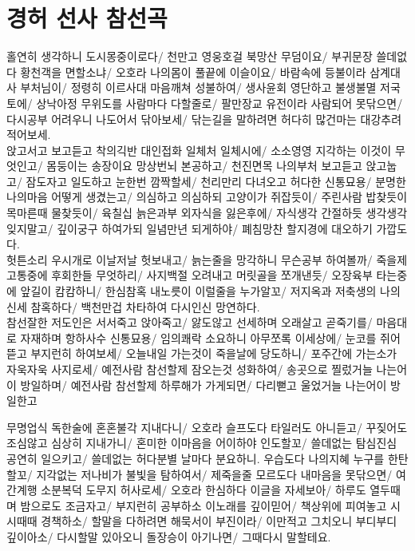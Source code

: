\documentclass[12pt, a4paper, oneside]{book}
\let\stdsection\section
\renewcommand\section{\newpage\stdsection}
\begin{document}
%										
	\section{ 경허 선사 참선곡 }


홀연히 생각하니 도시몽중이로다/ 천만고 영웅호걸 북망산 무덤이요/ 부귀문장 쓸데없다 황천객을 면할소냐/ 오호라 나의몸이 풀끝에 이슬이요/ 바람속에 등불이라 삼계대사 부처님이/ 정령히 이르사대 마음깨쳐 성불하여/ 생사윤회 영단하고 불생불멸 저국토에/ 상낙아정 무위도를 사람마다 다할줄로/ 팔만장교 유전이라 사람되어 못닦으면/ 다시공부 어려우니 나도어서 닦아보세/ 닦는길을 말하려면 허다히 많건마는 대강추려 적어보세.\\

앉고서고 보고듣고 착의긱반 대인접화 일체처 일체시에/ 소소영영 지각하는 이것이 무엇인고/ 몸둥이는 송장이요 망상번뇌 본공하고/ 천진면목 나의부처 보고듣고 앉고눕고/ 잠도자고 일도하고 눈한번 깜짝할세/ 천리만리 다녀오고 허다한 신통묘용/ 분명한 나의마음 어떻게 생겼는고/ 의심하고 의심하되 고양이가 쥐잡듯이/ 주린사람 밥찾듯이 목마른때 물찾듯이/ 육칠십 늙은과부 외자식을 잃은후에/ 자식생각 간절하듯 생각생각 잊지말고/ 깊이궁구 하여가되 일념만년 되게하야/ 폐침망찬 할지경에 대오하기 가깝도다.\\

헛튼소리 우시개로 이날저날 헛보내고/ 늙는줄을 망각하니 무슨공부 하여볼까/ 죽을제 고통중에 후회한들 무엇하리/ 사지백절 오려내고 머릿골을 쪼개낸듯/ 오장육부 타는중에 앞길이 캄캄하니/ 한심참혹 내노릇이 이럴줄을 누가알꼬/ 저지옥과 저축생의 나의신세 참혹하다/ 백천만겁 차타하여 다시인신 망연하다.\\

참선잘한 저도인은 서서죽고 앉아죽고/ 앓도않고 선세하며 오래살고 곧죽기를/ 마음대로 자재하며 항하사수 신통묘용/ 임의쾌락 소요하니 아무쪼록 이세상에/ 눈코를 쥐어뜯고 부지런히 하여보세/ 오늘내일 가는것이 죽을날에 당도하니/ 포주간에 가는소가 자욱자욱 사지로세/ 예전사람 참선할제 잠오는것 성화하여/ 송곳으로 찔렀거늘 나는어이 방일하며/ 예전사람 참선할제 하루해가 가게되면/ 다리뻗고 울었거늘 나는어이 방일한고

무명업식 독한술에 혼혼불각 지내다니/ 오호라 슬프도다 타일러도 아니듣고/ 꾸짖어도 조심않고 심상히 지내가니/ 혼미한 이마음을 어이하야 인도할꼬/ 쓸데없는 탐심진심 공연히 일으키고/ 쓸데없는 허다분별 날마다 분요하니. 우습도다 나의지혜 누구를 한탄할꼬/ 지각없는 저나비가 불빛을 탐하여서/ 제죽을줄 모르도다 내마음을 못닦으면/ 여간계행 소분복덕 도무지 허사로세/ 오호라 한심하다 이글을 자세보아/ 하루도 열두때며 밤으로도 조금자고/ 부지런히 공부하소 이노래를 깊이믿어/ 책상위에 피여놓고 시시때때 경책하소/ 할말을 다하려면 해묵서이 부진이라/ 이만적고 그치오니 부디부디 깊이아소/ 다시할말 있아오니 돌장승이 아기나면/ 그때다시 말할테요.
\end{document}

